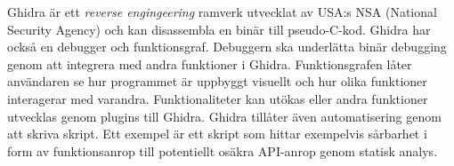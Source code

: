 Ghidra är ett \emph{reverse engingeering} ramverk utvecklat av USA:s NSA
(National Security Agency) och kan disassembla en binär till pseudo-C-kod.
Ghidra har också en debugger och funktionsgraf. Debuggern ska underlätta binär
debugging genom att integrera med andra funktioner i Ghidra. Funktionsgrafen
låter användaren se hur programmet är uppbyggt visuellt och hur olika
funktioner interagerar med varandra. Funktionaliteter kan utökas eller andra
funktioner utvecklas genom plugins till Ghidra\cite{ghidra_use_cases}. Ghidra
tillåter även automatisering genom att skriva skript. Ett exempel är ett skript
som hittar exempelvis sårbarhet i form av funktionsanrop till potentiellt
osäkra API-anrop genom statisk analys\cite{ghidra_script}.
